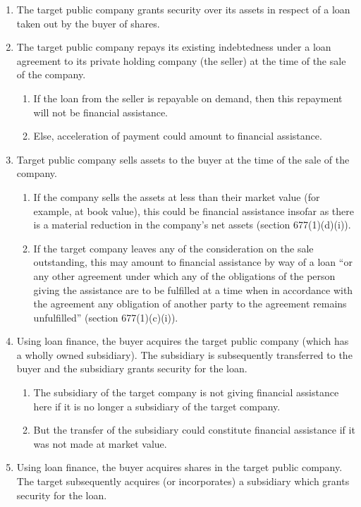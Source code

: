 \documentclass[
]{article}
\providecommand{\tightlist}{%
  \setlength{\itemsep}{0pt}\setlength{\parskip}{0pt}}
\begin{document}
\begin{enumerate}
\def\labelenumi{\arabic{enumi}.}
\tightlist
\item
  The target public company grants security over its assets in respect
  of a loan taken out by the buyer of shares.
\item
  The target public company repays its existing indebtedness under a
  loan agreement to its private holding company (the seller) at the time
  of the sale of the company.

  \begin{enumerate}
  \def\labelenumii{\arabic{enumii}.}
  \tightlist
  \item
    If the loan from the seller is repayable on demand, then this
    repayment will not be financial assistance.
  \item
    Else, acceleration of payment could amount to financial assistance.
  \end{enumerate}
\item
  Target public company sells assets to the buyer at the time of the
  sale of the company.

  \begin{enumerate}
  \def\labelenumii{\arabic{enumii}.}
  \tightlist
  \item
    If the company sells the assets at less than their market value (for
    example, at book value), this could be financial assistance insofar
    as there is a material reduction in the company's net assets
    (section 677(1)(d)(i)).
  \item
    If the target company leaves any of the consideration on the sale
    outstanding, this may amount to financial assistance by way of a
    loan ``or any other agreement under which any of the obligations of
    the person giving the assistance are to be fulfilled at a time when
    in accordance with the agreement any obligation of another party to
    the agreement remains unfulfilled'' (section 677(1)(c)(i)).
  \end{enumerate}
\item
  Using loan finance, the buyer acquires the target public company
  (which has a wholly owned subsidiary). The subsidiary is subsequently
  transferred to the buyer and the subsidiary grants security for the
  loan.

  \begin{enumerate}
  \def\labelenumii{\arabic{enumii}.}
  \tightlist
  \item
    The subsidiary of the target company is not giving financial
    assistance here if it is no longer a subsidiary of the target
    company.
  \item
    But the transfer of the subsidiary could constitute financial
    assistance if it was not made at market value.
  \end{enumerate}
\item
  Using loan finance, the buyer acquires shares in the target public
  company. The target subsequently acquires (or incorporates) a
  subsidiary which grants security for the loan.


\end{enumerate}
\end{document}
